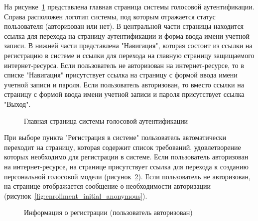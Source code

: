 \label{sec:workorder}

На рисунке~\ref{fig:main_page} представлена главная страница системы голосовой аутентификации. Справа расположен логотип системы, под которым отражается статус пользователя (авторизован или нет). В центральной части страницы находится ссылка для перехода на страницу аутентификации и форма ввода имени учетной записи.
В нижней части представлена "Навигация", которая состоит из ссылки на регистрацию в системе и ссылки для перехода на главную страницу защищаемого интернет-ресурса. Если пользователь не авторизован на интернет-ресурсе, то в списке "Навигация" присутствует ссылка на страницу с формой ввода имени учетной записи и пароля. Если пользователь авторизован, то вместо ссылки на страницу с формой ввода имени учетной записи и пароля присутствует ссылка "Выход".

\begin{figure}[hbt!]
\caption{Главная страница системы голосовой аутентификации}
\label{fig:main_page}
\end{figure}

При выборе пункта "Регистрация в системе" пользователь автоматически переходит на страницу, которая содержит список требований, удовлетворение которых необходимо для регистрации в системе. Если пользователь авторизован на интернет-ресурсе, на странице присутствует ссылка для перехода к созданию персональной голосовой модели (рисунок~\ref{fig:enrollment_initial_authentificated}). Если пользователь не авторизован, на странице отображается сообщение о необходимости авторизации (рисунок~\ref{fig:enrollment_initial_anonymous}).

\begin{figure}[hbt!]
\caption{Информация о регистрации (пользователь авторизован)}
\label{fig:enrollment_initial_authentificated}
\end{figure}

